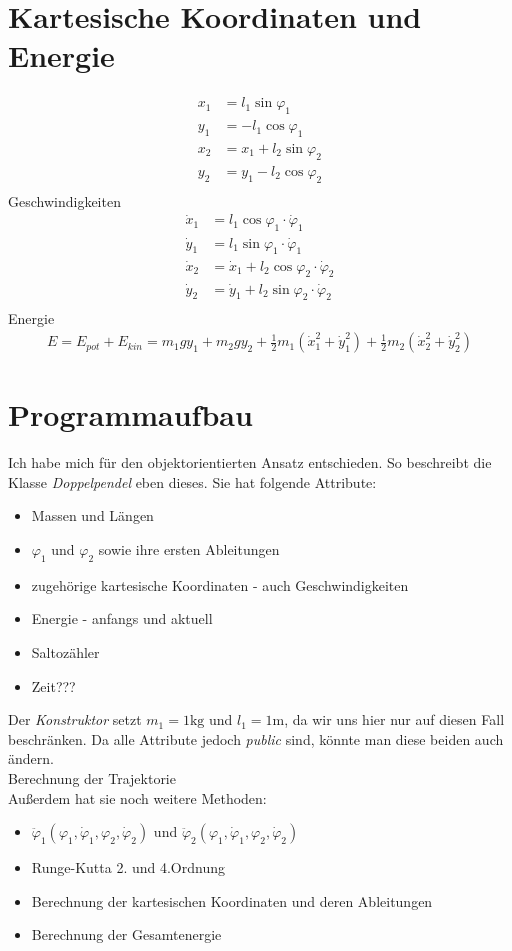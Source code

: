\documentclass[12pt,a4paper,titlepage,headinclude,bibtotoc]{scrartcl}
\begin{document}
\section{Kartesische Koordinaten und Energie}
\begin{align*}
	x_1 &= l_1\sin\varphi_1\\
	y_1 &= -l_1\cos\varphi_1\\	
	x_2 &= x_1+l_2\sin\varphi_2\\
	y_2 &= y_1-l_2\cos\varphi_2\\
\end{align*}
Geschwindigkeiten
\begin{align*}
	\dot{x}_1 &= l_1\cos\varphi_1 \cdot \dot{\varphi}_1\\
	\dot{y}_1 &= l_1\sin\varphi_1 \cdot \dot{\varphi}_1\\	
	\dot{x}_2 &= \dot{x}_1 + l_2\cos\varphi_2 \cdot \dot{\varphi}_2\\
	\dot{y}_2 &= \dot{y}_1 + l_2\sin\varphi_2 \cdot \dot{\varphi}_2\\
\end{align*}
Energie
\begin{align*}
	E = E_{pot}+E_{kin} = m_1gy_1+m_2gy_2 + \frac{1}{2}m_1\left(\dot{x}_1^2+\dot{y}_1^2\right) + \frac{1}{2}m_2\left(\dot{x}_2^2+\dot{y}_2^2\right)
\end{align*}

\section{Programmaufbau}
Ich habe mich für den objektorientierten Ansatz entschieden.
So beschreibt die Klasse \textit{Doppelpendel} eben dieses. 
Sie hat folgende Attribute:
\begin{itemize}
	\item Massen und Längen	
	\item $\varphi_1$ und $\varphi_2$ sowie ihre ersten Ableitungen
	\item zugehörige kartesische Koordinaten - auch Geschwindigkeiten
	\item Energie - anfangs und aktuell
	\item Saltozähler
	\item Zeit???
\end{itemize}
Der \textit{Konstruktor} setzt $m_1=1\si{\kilo\gram}$ und $l_1=1\si{\meter}$, da wir uns hier nur auf diesen Fall beschränken.
Da alle Attribute jedoch \textit{public} sind, könnte man diese beiden auch ändern.\\
Berechnung der Trajektorie\\
Außerdem hat sie noch weitere Methoden:
\begin{itemize}
	\item $\ddot{\varphi}_1\left(\varphi_1, \dot{\varphi}_1,\varphi_2, \dot{\varphi}_2\right)$ und $\ddot{\varphi}_2\left(\varphi_1, \dot{\varphi}_1,\varphi_2, \dot{\varphi}_2\right)$
	\item Runge-Kutta 2. und 4.Ordnung	
	\item Berechnung der kartesischen Koordinaten und deren Ableitungen
	\item Berechnung der Gesamtenergie
\end{itemize}
\end{document}
